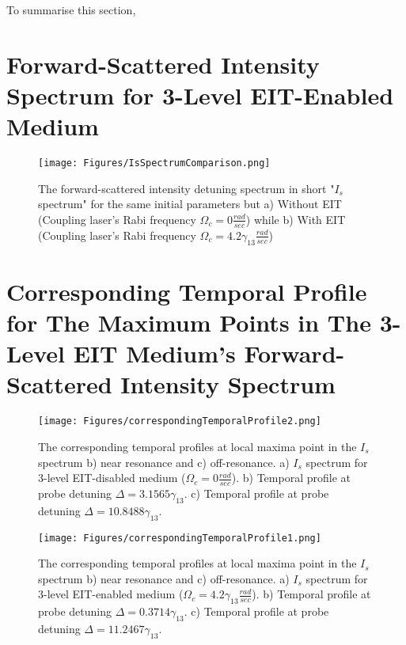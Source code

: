 To summarise this section, 



\section{Forward-Scattered Intensity Spectrum for 3-Level EIT-Enabled Medium}

\begin{figure}[h!]
    \centering
    \texttt{[image: Figures/IsSpectrumComparison.png]}
    \caption{The forward-scattered intensity detuning spectrum in short "$I_{s}$ spectrum" for the same initial parameters but a) Without EIT (Coupling laser's Rabi frequency $\Omega_{c} = 0 \frac{rad}{sec}$) while b) With EIT (Coupling laser's Rabi frequency $\Omega_{c} = 4.2\gamma_{13} \frac{rad}{sec}$)}
    \label{fig: comparing Is sepctrum}
\end{figure}


\section{Corresponding Temporal Profile for The Maximum Points in The 3-Level EIT Medium's Forward-Scattered Intensity Spectrum}

\begin{figure}[h!]
    \centering
    \texttt{[image: Figures/correspondingTemporalProfile2.png]}
    \caption{The corresponding temporal profiles at local maxima point in the $I_{s}$ spectrum b) near resonance and c) off-resonance. a) $I_{s}$ spectrum for 3-level EIT-disabled medium ($\Omega_{c} = 0 \frac{rad}{sec}$). b)  Temporal profile at probe detuning $\Delta = 3.1565\gamma_{13}$. c) Temporal profile at probe detuning $\Delta = 10.8488\gamma_{13}$.}
    \label{fig: corresponding temporal profile 1}
\end{figure}

\begin{figure}[h!]
    \centering
     \texttt{[image: Figures/correspondingTemporalProfile1.png]}
    \caption{The corresponding temporal profiles at local maxima point in the $I_{s}$ spectrum b) near resonance and c) off-resonance. a) $I_{s}$ spectrum for 3-level EIT-enabled medium ($\Omega_{c} = 4.2\gamma_{13} \frac{rad}{sec}$). b)  Temporal profile at probe detuning $\Delta = 0.3714\gamma_{13}$. c) Temporal profile at probe detuning $\Delta = 11.2467\gamma_{13}$.}
    \label{fig: corresponding temporal profile 2}
\end{figure}

